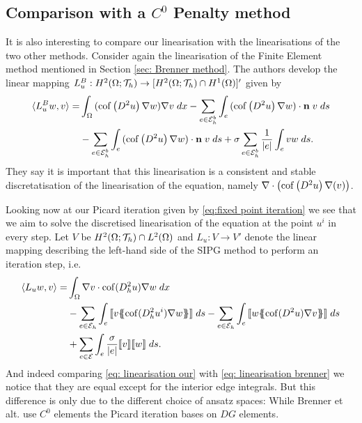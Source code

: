 \subsection{Comparison with a $C^0$ Penalty method}
It is also interesting to compare our linearisation with the linearisations of the two other methods.
Consider again the linearisation of the Finite Element method mentioned in Section \ref{sec: Brenner method}. The authors develop the linear mapping $L^B_u:H^2(\Omega; \mathcal{T}_h) \rightarrow [H^2(\Omega; \mathcal{T}_h) \cap H^1(\Omega)]'$ given by
\begin{align}
 \langle L^B_{u} w, v \rangle
	=&\int_{\Omega} {{ (\operatorname{cof} \left( D^2  u \right)\nabla w) \nabla v}\;dx}
		- \sum_{e \in \mathcal{E}_h^b} \int_{e} {{ (\operatorname{cof} \left( D^2 u \right)\nabla w) \cdot \mathbf n \; v}\;ds} \nonumber \\
		&-  \sum_{e \in \mathcal{E}_h^b} \int_{e} {{ (\operatorname{cof} \left( D^2 u \right)\nabla w) \cdot \mathbf n \; v}\;ds} 
		+ \sigma \sum_{e \in \mathcal{E}_h^b} \frac 1 {|e|} \int_{e} {{ v w}\;ds}.
		\label{eq: linearisation brenner}
\end{align}
They say it is important that this linearisation is a consistent and stable discretatisation of the linearisation of the \MA equation, namely $\nabla \cdot \left( \operatorname{cof} \left( D^2 u  \right) \nabla (v) \right)$.

Looking now at our Picard iteration given by \ref{eq:fixed point iteration} we see that we aim to solve the discretised linearisation of the \MA equation at the point $u^i$ in every step.
Let $V$ be $H^2(\Omega; \mathcal{T}_h) \cap L^2(\Omega)$ and $L_u: V \rightarrow V'$ denote the linear mapping describing the left-hand side of the SIPG method to perform an iteration step, i.e.
\begin{align}
	\bilin {L_u w} v =
 &\myIntX  \Omega { \nabla v \cdot \cof(D_h^2 u) \nabla w } \nonumber\\
 & -\sum\limits_{e \in \edges}\myIntS e { \jump {v \average { \cof(D_h^2 u^{i}) \nabla w} }}
 - \sum\limits_{e \in \edges}\myIntS e { \jump {w \average{ \cof(D^2 u) \nabla v} }} \nonumber\\  
 & +\sum\limits_{e \in \bigEps} \myIntS e { \frac \sigma {|e|} \jump {v}  \jump {w}}. \label{eq: linearisation our}
\end{align}
And indeed comparing \eqref{eq: linearisation our} with \eqref{eq: linearisation brenner} we notice that they are equal except for the interior edge integrals. But this difference is only due to the different choice of ansatz spaces: While Brenner et alt. use $C^0$ elements the Picard iteration bases on $DG$ elements.

